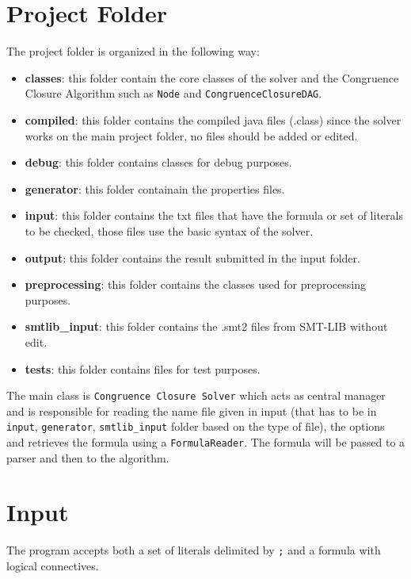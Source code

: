 \documentclass[11pt,a4paper]{article}
\begin{document}
    \section{Project Folder}
    The project folder is organized in the following way:
    \begin{itemize}
        \item \textbf{classes}: this folder contain the core classes of the solver and the Congruence Closure Algorithm such as \texttt{Node} and \texttt{CongruenceClosureDAG}.
        \item \textbf{compiled}: this folder contains the compiled java files (.class) since
        the solver works on the main project folder, no files should be added or edited.
        \item \textbf{debug}: this folder contains classes for debug purposes.
        \item \textbf{generator}: this folder containain the properties files.
        \item \textbf{input}: this folder contains the txt files that have the formula or set of literals to be checked, those files use the basic syntax of the solver.
        \item \textbf{output}: this folder contains the result submitted in the input folder.
        \item \textbf{preprocessing}: this folder contains the classes used for preprocessing purposes.
        \item \textbf{smtlib\_input}: this folder contains the .smt2 files from SMT-LIB without edit.
        \item \textbf{tests}: this folder contains files for test purposes.
    \end{itemize}

    The main class is \texttt{Congruence Closure Solver} which acts as central manager and is responsible for reading the name file given in input (that has to be in \texttt{input}, \texttt{generator}, \texttt{smtlib\_input} folder based on the type of file), the options and retrieves the formula using a \texttt{FormulaReader}. The formula will be passed to a parser and then to the algorithm.

    \section{Input}

    The program accepts both a set of literals delimited by \texttt{;} and a formula with logical connectives.
\end{document}
